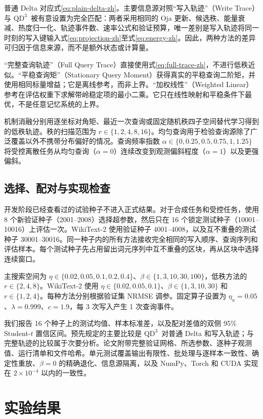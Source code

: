 \documentclass[11pt,a4paper]{ctexart}
\newcommand{\QDDD}{\ensuremath{\mathrm{QD}^{3}}}
\begin{document}
普通 Delta 对应式\eqref{eq:plain-delta-zh}。主要信息源对照“写入轨迹”（Write Trace）与 \QDDD\ 被有意设置为完全匹配：两者采用相同的 Oja 更新、候选秩、能量衰减、热度归一化、轨迹事件数、速率公式和验证预算，唯一差别是写入轨迹将同一时刻的写入键输入式\eqref{eq:projection-zh}至式\eqref{eq:energy-zh}。因此，两种方法的差异可归因于信息来源，而不是额外状态或计算量。

“完整查询轨迹”（Full Query Trace）直接使用式\eqref{eq:full-trace-zh}，不进行低秩近似。“平稳查询矩”（Stationary Query Moment）获得真实的平稳查询二阶矩，并使用相同标量增益；它是离线参考，而非上界。“加权线性”（Weighted Linear）参考在评估权重下求解带岭稳定项的最小二乘。它只在线性映射和平稳条件下最优，不是任意记忆系统的上界。

机制消融分别用逐坐标对角矩、最近一次查询或固定随机秩四子空间替代学习得到的低秩轨迹。秩的扫描范围为 $r\in\{1,2,4,8,16\}$。均匀查询用于检验查询源除了广泛覆盖以外不携带分布偏好的情况。查询频率指数 $\alpha\in\{0,0.25,0.5,0.75,1,1.25\}$ 将受控离散任务从均匀查询（$\alpha=0$）连续改变到观测偏斜程度（$\alpha=1$）以及更强偏斜。

\subsection{选择、配对与实现检查}

开发阶段已经查看过的试验种子不进入正式结果。对于合成任务和受控任务，使用 8 个新验证种子（2001--2008）选择超参数，然后只在 16 个锁定测试种子（10001--10016）上评估一次。WikiText-2 使用验证种子 4001--4008，以及互不重叠的测试种子 30001--30016。同一种子内的所有方法接收完全相同的写入顺序、查询序列和评估样本。每个测试种子先占用留出词元序列中互不重叠的区块，再从区块中选择连续窗口。

主搜索空间为 $\eta\in\{0.02,0.05,0.1,0.2,0.4\}$、$\beta\in\{1,3,10,30,100\}$，低秩方法的 $r\in\{2,4,8\}$。WikiText-2 使用 $\eta\in\{0.02,0.05,0.1\}$、$\beta\in\{1,3,10,30\}$ 和 $r\in\{1,2,4\}$。每种方法分别根据验证集 NRMSE 调参。固定算子设置为 $\eta_u=0.05$、$\lambda=0.999$、$c=1.9$，每 3 次写入产生 1 次查询事件。

我们报告 16 个种子上的测试均值、样本标准差，以及配对差值的双侧 95\% Student-$t$ 置信区间。预先规定的主要比较是 \QDDD\ 对普通 Delta 和写入轨迹；与完整轨迹的比较属于次要分析。论文附带完整验证网格、所选参数、逐种子观测值、运行清单和文件哈希。单元测试覆盖输出有限性、批处理与逐样本一致性、确定性重放、$\beta=0$ 的精确退化、信息源隔离，以及 NumPy、Torch 和 CUDA 实现在 $2\times10^{-4}$ 以内的一致性。

\section{实验结果}\label{sec:results-zh}
\end{document}
